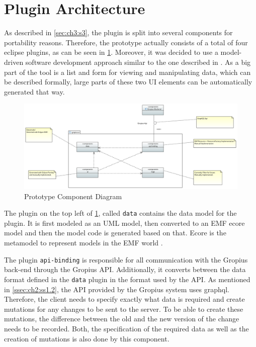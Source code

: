 \section{Plugin Architecture}
\label{sec:ch4:s3}
As described in \cref{sec:ch3:s3}, the plugin is split into several components for portability reasons.
Therefore, the prototype actually consists of a total of four eclipse plugins, as can be seen in \cref{fig:c4:component_diagram}.
Moreover, it was decided to use a model-driven software development approach similar to the one described in \cite{beydeda2005model}.
As a big part of the tool is a list and form for viewing and manipulating data, which can be described formally,
large parts of these two \gls{UI} elements can be automatically generated that way.

\begin{figure}[!h]
	\centering
	\includegraphics[width=\textwidth]{graphics/Component_Diagram.png}
	\caption{Prototype Component Diagram}
	\label{fig:c4:component_diagram}
\end{figure}

The plugin on the top left of \cref{fig:c4:component_diagram}, called \lstinline|data| contains the data model for the plugin. 
It is first modeled as an \gls{UML} model, then converted to an \gls{EMF} ecore model and then the model code is generated based on that.
Ecore is the metamodel to represent models in the \gls{EMF} world \cite{steinberg2008emf}.

The plugin \lstinline|api-binding| is responsible for all communication with the Gropius back-end through the Gropius \gls{API}.
Additionally, it converts between the data format defined in the \lstinline|data| plugin in the format used by the \gls{API}.
As mentioned in \cref{ssec:ch2:ss1.2}, the \gls{API} provided by the Gropius system uses \gls{graphql}.
Therefore, the client needs to specify exactly what data is required and create mutations for any changes to be sent to the server.
To be able to create these mutations, the difference between the old and the new version of the change needs to be recorded.
Both, the specification of the required data as well as the creation of mutations is also done by this component.

